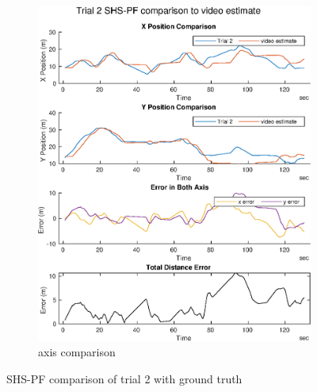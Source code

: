 \begin{figure}[H]
\begin{subfigure}[t]{.45\textwidth}
		\includegraphics[width=\linewidth]{images/20201118_1902_trial2_output_1}
		\caption{axis comparison}
		\label{fig:shspf_trial2_comparison}
	\end{subfigure}
	\caption{SHS-PF comparison of trial 2 with ground truth}
	\label{fig:shspf_trial2_shs_gt_comparison}
\end{figure}

